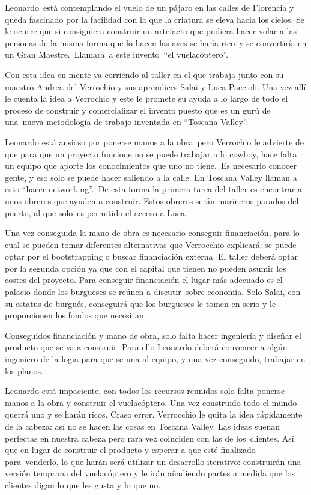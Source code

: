{
Leonardo\ est\'a contemplando el vuelo de un p\'ajaro en las calles de Florencia y queda fascinado por la facilidad con
la que la criatura se eleva hacia los cielos. Se le ocurre que si consiguiera construir un artefacto que pudiera hacer
volar a las personas de la misma forma que lo hacen las aves se har\'ia rico\ y se convertir\'ia en un Gran
Maestre.\ Llamar\'a\ a este invento\ {}``el vuelac\'optero''.}

{
Con esta idea en mente va corriendo al taller en el que trabaja junto con su maestro Andrea del Verrochio y sus
aprendices Salai y Luca Paccioli. Una vez all\'i le cuenta la idea a Verrochio y este le promete su ayuda a lo largo de
todo el proceso de construir y comercializar el invento puesto que es un gur\'u de una\ nueva metodolog\'ia de trabajo
inventada en ``Toscana Valley''.\ }

{
Leonardo est\'a ansioso por ponerse manos a la obra\ pero Verrochio le advierte de que para que un proyecto funcione no
se puede trabajar a lo cowboy, hace falta un equipo que aporte los conocimientos que uno no tiene.\ Es necesario
conocer gente, y eso solo se puede hacer saliendo a la calle. En Toscana Valley llaman a esto ``hacer networking''.\ De
esta forma la primera tarea del taller es encontrar a unos obreros que ayuden a construir. Estos obreros ser\'an
marineros parados del puerto, al que solo\ es permitido el acceso a Luca.}

{
Una vez conseguida la mano de obra es necesario conseguir financiaci\'on, para lo cual se pueden tomar diferentes
alternativas que Verrocchio explicar\'a: se puede optar por el bootstrapping o buscar financiaci\'on externa. El taller
deber\'a optar por la segunda opci\'on ya que con el capital que tienen no pueden asumir los costes del proyecto. Para
conseguir financiaci\'on el lugar m\'as adecuado es el palacio donde los burgueses se re\'unen a discutir\ sobre
econom\'ia. Solo Salai, con su estatus de burgu\'es, conseguir\'a que los burgueses le tomen en serio y le proporcionen
los fondos que necesitan.}

{
Conseguidos financiaci\'on y mano de obra, solo falta hacer ingenier\'ia y dise\~nar el producto que se va a construir.
Para ello Leonardo deber\'a convencer a alg\'un ingeniero de la logia para que se una al equipo, y una vez conseguido,
trabajar en los planos.}

{
Leonardo est\'a impaciente, con todos los recursos reunidos solo falta ponerse manos a la obra y construir el
vuelac\'optero. Una vez construido todo el mundo querr\'a uno y se har\'an ricos. Craso error. Verrocchio le quita la
idea r\'apidamente de la cabeza: as\'i no se hacen las cosas en Toscana Valley. Las ideas suenan perfectas en nuestra
cabeza pero rara vez coinciden con las de los\ clientes. As\'i que en lugar de construir el producto y esperar a que
est\'e finalizado para\ venderlo, lo que har\'an ser\'a utilizar un desarrollo iterativo: construir\'an una versi\'on
temprana del vuelac\'optero y le ir\'an a\~nadiendo partes a medida que los clientes digan lo que les gusta y lo que
no.}

